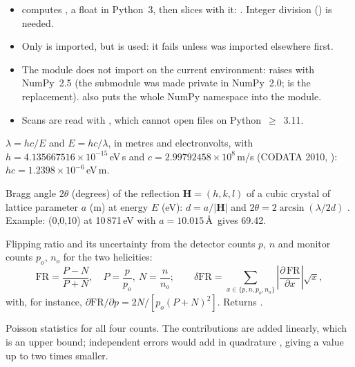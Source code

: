 \begin{issue}
\begin{itemize}[nosep,leftmargin=1em]
\item {} computes , a float in Python~3, then slices with it:
  . Integer division (\fn{//}) is needed.
\item Only  is imported, but  is used: it fails unless
   was imported elsewhere first.
\item The module does not import on the current environment:  raises  with NumPy~2.5 (the submodule was made private in
  NumPy~2.0;  is the replacement). 
  also puts the whole NumPy namespace into the module.
\item Scans are read with , which cannot open files on Python~$\ge$~3.11.
\end{itemize}
\end{issue}


$\lambda = hc/E$ and $E = hc/\lambda$, in metres and electronvolts, with
$h = 4.135667516\times10^{-15}$\,eV\,s and $c = 2.99792458\times10^8$\,m/s
(CODATA 2010, \citealp{Mohr2012}): $hc = 1.2398\times10^{-6}$\,eV\,m.

Bragg angle $2\theta$ (degrees) of the reflection $\mathbf H = (h,k,l)$ of a cubic crystal of
lattice parameter $a$ (m) at energy $E$ (eV): $d = a/|\mathbf H|$ and
$2\theta = 2\arcsin(\lambda/2d)$ \citep{Bragg1913}. Example: (0,0,10) at 10\,871\,eV with
$a = 10.015$\,\AA\ gives 69.42\textdegree.

Flipping ratio and its uncertainty from the detector counts $p$, $n$ and monitor counts
$p_o$, $n_o$ for the two helicities:
\begin{equation}
  \mathrm{FR} = \frac{P-N}{P+N}, \quad P = \frac{p}{p_o},\ N = \frac{n}{n_o}; \qquad
  \delta\mathrm{FR} = \sum_{x\in\{p,n,p_o,n_o\}}\left|\frac{\partial\,\mathrm{FR}}{\partial x}\right|
  \sqrt x ,
\end{equation}
with, for instance, $\partial\mathrm{FR}/\partial p = 2N/[p_o(P+N)^2]$. Returns
.
\begin{hyp}
Poisson statistics for all four counts. The contributions are added linearly, which is an
upper bound; independent errors would add in quadrature \citep{Bevington2003}, giving a value
up to two times smaller.
\end{hyp}

